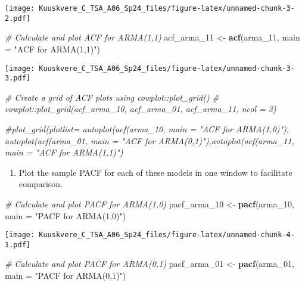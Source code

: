 \documentclass[
]{article}
\newenvironment{Shaded}{\begin{snugshade}}{\end{snugshade}}
\newcommand{\AttributeTok}[1]{\textcolor[rgb]{0.13,0.29,0.53}{#1}}
\newcommand{\CommentTok}[1]{\textcolor[rgb]{0.56,0.35,0.01}{\textit{#1}}}
\newcommand{\FunctionTok}[1]{\textcolor[rgb]{0.13,0.29,0.53}{\textbf{#1}}}
\newcommand{\NormalTok}[1]{#1}
\newcommand{\OtherTok}[1]{\textcolor[rgb]{0.56,0.35,0.01}{#1}}
\newcommand{\StringTok}[1]{\textcolor[rgb]{0.31,0.60,0.02}{#1}}
\providecommand{\tightlist}{%
  \setlength{\itemsep}{0pt}\setlength{\parskip}{0pt}}
\begin{document}
\texttt{[image: Kuuskvere\_C\_TSA\_A06\_Sp24\_files/figure-latex/unnamed-chunk-3-2.pdf]}

\begin{Shaded}
\begin{Highlighting}[]
\CommentTok{\# Calculate and plot ACF for ARMA(1,1)}
\NormalTok{acf\_arma\_11 }\OtherTok{\textless{}{-}} \FunctionTok{acf}\NormalTok{(arma\_11, }\AttributeTok{main =} \StringTok{"ACF for ARMA(1,1)"}\NormalTok{)}
\end{Highlighting}
\end{Shaded}

\texttt{[image: Kuuskvere\_C\_TSA\_A06\_Sp24\_files/figure-latex/unnamed-chunk-3-3.pdf]}

\begin{Shaded}
\begin{Highlighting}[]
\CommentTok{\# Create a grid of ACF plots using cowplot::plot\_grid()}
\CommentTok{\# cowplot::plot\_grid(acf\_arma\_10, acf\_arma\_01, acf\_arma\_11, ncol = 3)}

\CommentTok{\#plot\_grid(plotlist= autoplot(acf(arma\_10, main = "ACF for ARMA(1,0)"), autoplot(acf(arma\_01, main = "ACF for ARMA(0,1)"),autoplot(acf(arma\_11, main = "ACF for ARMA(1,1)")}
\end{Highlighting}
\end{Shaded}

\begin{enumerate}
\def\labelenumi{(\alph{enumi})}
\setcounter{enumi}{2}
\tightlist
\item
  Plot the sample PACF for each of these models in one window to
  facilitate comparison.
\end{enumerate}

\begin{Shaded}
\begin{Highlighting}[]
\CommentTok{\# Calculate and plot PACF for ARMA(1,0)}
\NormalTok{pacf\_arma\_10 }\OtherTok{\textless{}{-}} \FunctionTok{pacf}\NormalTok{(arma\_10, }\AttributeTok{main =} \StringTok{"PACF for ARMA(1,0)"}\NormalTok{)}
\end{Highlighting}
\end{Shaded}

\texttt{[image: Kuuskvere\_C\_TSA\_A06\_Sp24\_files/figure-latex/unnamed-chunk-4-1.pdf]}

\begin{Shaded}
\begin{Highlighting}[]
\CommentTok{\# Calculate and plot PACF for ARMA(0,1)}
\NormalTok{pacf\_arma\_01 }\OtherTok{\textless{}{-}} \FunctionTok{pacf}\NormalTok{(arma\_01, }\AttributeTok{main =} \StringTok{"PACF for ARMA(0,1)"}\NormalTok{)}
\end{Highlighting}
\end{Shaded}
\end{document}
